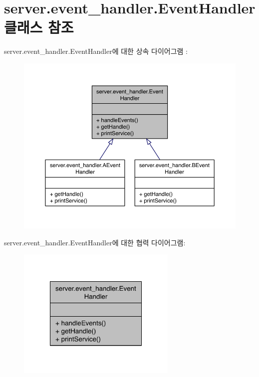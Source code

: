 \hypertarget{classserver_1_1event__handler_1_1_event_handler}{\section{server.\-event\-\_\-handler.\-Event\-Handler 클래스 참조}
\label{classserver_1_1event__handler_1_1_event_handler}
}


server.\-event\-\_\-handler.\-Event\-Handler에 대한 상속 다이어그램 \-: 
\nopagebreak
\begin{figure}[H]
\begin{center}
\leavevmode
\includegraphics[width=350pt]{classserver_1_1event__handler_1_1_event_handler__inherit__graph}
\end{center}
\end{figure}


server.\-event\-\_\-handler.\-Event\-Handler에 대한 협력 다이어그램\-:
\nopagebreak
\begin{figure}[H]
\begin{center}
\leavevmode
\includegraphics[width=216pt]{classserver_1_1event__handler_1_1_event_handler__coll__graph}
\end{center}
\end{figure}
